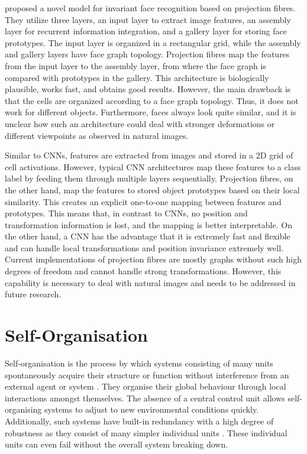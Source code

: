 proposed a novel model for invariant face recognition based on projection fibres.
They utilize three layers, an input layer to extract image features, an assembly layer for recurrent information integration, and a gallery layer for storing face prototypes.
The input layer is organized in a rectangular grid, while the assembly and gallery layers have face graph topology.
Projection fibres map the features from the input layer to the assembly layer, from where the face graph is compared with prototypes in the gallery.
This architecture is biologically plausible, works fast, and obtains good results. 
However, the main drawback is that the cells are organized according to a face graph topology. Thus, it does not work for different objects. Furthermore, faces always look quite similar, and it is unclear how such an architecture could deal with stronger deformations or different viewpoints as observed in natural images.

Similar to CNNs, features are extracted from images and stored in a 2D grid of cell activations.
However, typical CNN architectures map these features to a class label by feeding them through multiple layers sequentially. Projection fibres, on the other hand, map the features to stored object prototypes based on their local similarity. This creates an explicit one-to-one mapping between features and prototypes. This means that, in contrast to CNNs, no position and transformation information is lost, and the mapping is better interpretable.
On the other hand, a CNN has the advantage that it is extremely fast and flexible and can handle local transformations and position invariance extremely well. Current implementations of projection fibres are mostly graphs without such high degrees of freedom and cannot handle strong transformations. However, this capability is necessary to deal with natural images and needs to be addressed in future research.



\section{Self-Organisation}
Self-organisation is the process by which systems consisting of many units spontaneously acquire their structure or function without interference from an external agent or system .
They organise their global behaviour through local interactions amongst themselves.
The absence of a central control unit allows self-organising systems to adjust to new environmental conditions quickly.
Additionally, such systems have built-in redundancy with a high degree of robustness as they consist of many simpler individual units .
These individual units can even fail without the overall system breaking down.

